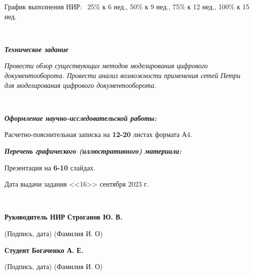 График выполнения НИР: ~25\% к 6 нед., 50\% к 9 нед., 75\% к 12 нед., 100\% к 15 нед.
	
~~
	
\textit{\bfseries{Техническое задание}}

\textit{Провести обзор существующих методов моделирования цифрового документооборота. Провести анализ возможности применения сетей Петри для моделирования цифрового документооборота.}
	
~~
	
\textit{\bfseries{Оформление научно-исследовательской работы:}}

Расчетно-пояснительная записка на \textbf{12-20} листах формата А4.

\textit{\bfseries{Перечень графического (иллюстративного) материала:}}	

Презентация на \textbf{6-10} слайдах.

Дата выдачи задания <<16>> сентября 2023 г.	

~~

\textbf{Руководитель НИР} \hspace{3.6cm} \uline{\mbox{\hspace*{3.5cm}}} \hspace{1.1cm} \textbf{Строганов Ю. В.}

\hfill (Подпись, дата) \hspace{1.9cm} (Фамилия И. О) \hspace{1.2cm}

\textbf{Студент} \hspace{5.7cm} \uline{\mbox{\hspace*{3.5cm}}} \hspace{1.1cm} \textbf{Богаченко А. Е.}

\hfill (Подпись, дата) \hspace{1.9cm} (Фамилия И. О) \hspace{1.2cm}
	
\setlength{\parindent}{1.25cm}